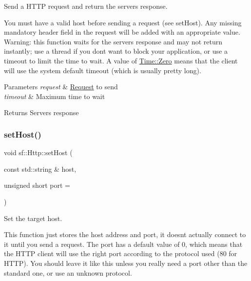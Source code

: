Send a H\+T\+TP request and return the server\textquotesingle{}s response. 

You must have a valid host before sending a request (see set\+Host). Any missing mandatory header field in the request will be added with an appropriate value. Warning\+: this function waits for the server\textquotesingle{}s response and may not return instantly; use a thread if you don\textquotesingle{}t want to block your application, or use a timeout to limit the time to wait. A value of \mbox{\hyperlink{classsf_1_1_time_a8db127b632fa8da21550e7282af11fa0}{Time\+::\+Zero}} means that the client will use the system default timeout (which is usually pretty long).


\begin{DoxyParams}{Parameters}
{\em request} & \mbox{\hyperlink{classsf_1_1_http_1_1_request}{Request}} to send \\
\hline
{\em timeout} & Maximum time to wait\\
\hline
\end{DoxyParams}
\begin{DoxyReturn}{Returns}
Server\textquotesingle{}s response \begin{DoxyVerb}\end{DoxyVerb}
 
\end{DoxyReturn}
\mbox{\label{classsf_1_1_http_a55121d543b61c41cf20b885a97b04e65}} 
\subsubsection{\texorpdfstring{setHost()}{setHost()}}
{\footnotesize\ttfamily void sf\+::\+Http\+::set\+Host (\begin{DoxyParamCaption}\item[{const std\+::string \&}]{host,  }\item[{unsigned short}]{port = {} }\end{DoxyParamCaption})}



Set the target host. 

This function just stores the host address and port, it doesn\textquotesingle{}t actually connect to it until you send a request. The port has a default value of 0, which means that the H\+T\+TP client will use the right port according to the protocol used (80 for H\+T\+TP). You should leave it like this unless you really need a port other than the standard one, or use an unknown protocol.


